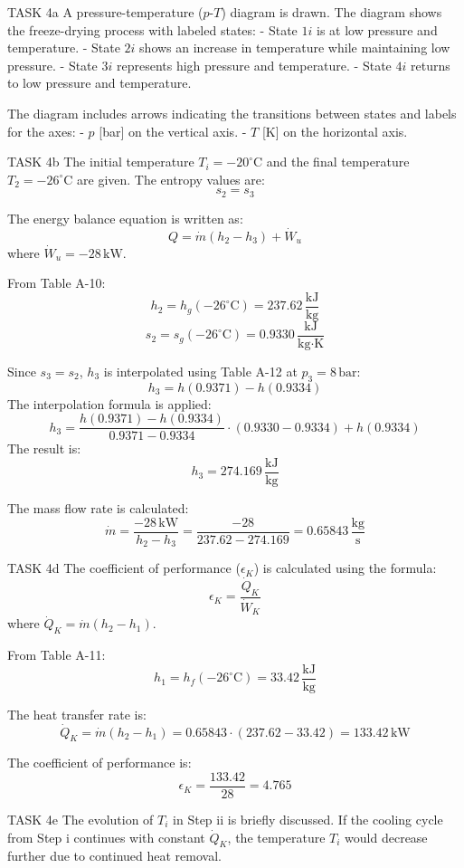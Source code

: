 TASK 4a  
A pressure-temperature (\( p \)-\( T \)) diagram is drawn. The diagram shows the freeze-drying process with labeled states:  
- State \( 1i \) is at low pressure and temperature.  
- State \( 2i \) shows an increase in temperature while maintaining low pressure.  
- State \( 3i \) represents high pressure and temperature.  
- State \( 4i \) returns to low pressure and temperature.  

The diagram includes arrows indicating the transitions between states and labels for the axes:  
- \( p \) [bar] on the vertical axis.  
- \( T \) [K] on the horizontal axis.  

TASK 4b  
The initial temperature \( T_i = -20^\circ\text{C} \) and the final temperature \( T_2 = -26^\circ\text{C} \) are given.  
The entropy values are:  
\[
s_2 = s_3
\]  

The energy balance equation is written as:  
\[
Q = \dot{m} (h_2 - h_3) + \dot{W}_u
\]  
where \( \dot{W}_u = -28 \, \text{kW} \).  

From Table A-10:  
\[
h_2 = h_g(-26^\circ\text{C}) = 237.62 \, \frac{\text{kJ}}{\text{kg}}
\]  
\[
s_2 = s_g(-26^\circ\text{C}) = 0.9330 \, \frac{\text{kJ}}{\text{kg·K}}
\]  

Since \( s_3 = s_2 \), \( h_3 \) is interpolated using Table A-12 at \( p_3 = 8 \, \text{bar} \):  
\[
h_3 = h(0.9371) - h(0.9334)
\]  
The interpolation formula is applied:  
\[
h_3 = \frac{h(0.9371) - h(0.9334)}{0.9371 - 0.9334} \cdot (0.9330 - 0.9334) + h(0.9334)
\]  
The result is:  
\[
h_3 = 274.169 \, \frac{\text{kJ}}{\text{kg}}
\]  

The mass flow rate is calculated:  
\[
\dot{m} = \frac{-28 \, \text{kW}}{h_2 - h_3} = \frac{-28}{237.62 - 274.169} = 0.65843 \, \frac{\text{kg}}{\text{s}}
\]  

TASK 4d  
The coefficient of performance (\( \epsilon_K \)) is calculated using the formula:  
\[
\epsilon_K = \frac{\dot{Q}_K}{\dot{W}_K}
\]  
where \( \dot{Q}_K = \dot{m} (h_2 - h_1) \).  

From Table A-11:  
\[
h_1 = h_f(-26^\circ\text{C}) = 33.42 \, \frac{\text{kJ}}{\text{kg}}
\]  

The heat transfer rate is:  
\[
\dot{Q}_K = \dot{m} (h_2 - h_1) = 0.65843 \cdot (237.62 - 33.42) = 133.42 \, \text{kW}
\]  

The coefficient of performance is:  
\[
\epsilon_K = \frac{133.42}{28} = 4.765
\]  

TASK 4e  
The evolution of \( T_i \) in Step ii is briefly discussed. If the cooling cycle from Step i continues with constant \( \dot{Q}_K \), the temperature \( T_i \) would decrease further due to continued heat removal.